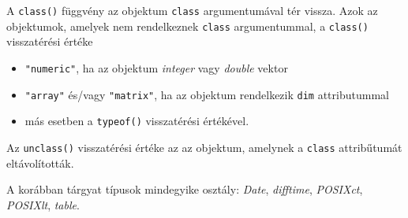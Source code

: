 \documentclass[
]{book}
\providecommand{\tightlist}{%
  \setlength{\itemsep}{0pt}\setlength{\parskip}{0pt}}
\begin{document}
A \texttt{class()} függvény az objektum \texttt{class} argumentumával tér vissza. Azok az objektumok, amelyek nem rendelkeznek \texttt{class} argumentummal, a \texttt{class()} visszatérési értéke

\begin{itemize}
\tightlist
\item
  \texttt{"numeric"}, ha az objektum \emph{integer} vagy \emph{double} vektor
\item
  \texttt{"array"} és/vagy \texttt{"matrix"}, ha az objektum rendelkezik \texttt{dim} attributummal
\item
  más esetben a \texttt{typeof()} visszatérési értékével.
\end{itemize}

Az \texttt{unclass()} visszatérési értéke az az objektum, amelynek a \texttt{class} attribűtumát eltávolították.

A korábban tárgyat típusok mindegyike osztály: \emph{Date}, \emph{difftime}, \emph{POSIXct}, \emph{POSIXlt}, \emph{table}.
\end{document}
